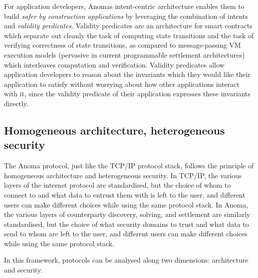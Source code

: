For application developers, Anoma\textquotesingle s intent-centric
architecture enables them to build \emph{safer by construction
applications} by leveraging the combination of intents and
\emph{validity predicates}. Validity predicates are an architecture for
smart contracts which separate out cleanly the task of computing state
transitions and the task of verifying correctness of state transitions,
as compared to message-passing VM execution models (pervasive in current
programmable settlement architectures) which interleaves computation and
verification. Validity predicates allow application developers to reason
about the invariants which they would like their application to satisfy
without worrying about how other applications interact with it, since
the validity predicate of their application expresses these invariants
directly.

\subsection{Homogeneous architecture, heterogeneous
security}\label{homogeneous-architecture-heterogeneous-security}

The Anoma protocol, just like the TCP/IP protocol stack, follows the
principle of homogeneous architecture and heterogeneous security. In
TCP/IP, the various layers of the internet protocol are standardised,
but the choice of whom to connect to and what data to entrust them with
is left to the user, and different users can make different choices
while using the same protocol stack. In Anoma, the various layers of
counterparty discovery, solving, and settlement are similarly
standardised, but the choice of what security domains to trust and what
data to send to whom are left to the user, and different users can make
different choices while using the same protocol stack.

In this framework, protocols can be analysed along two dimensions:
architecture and security.

